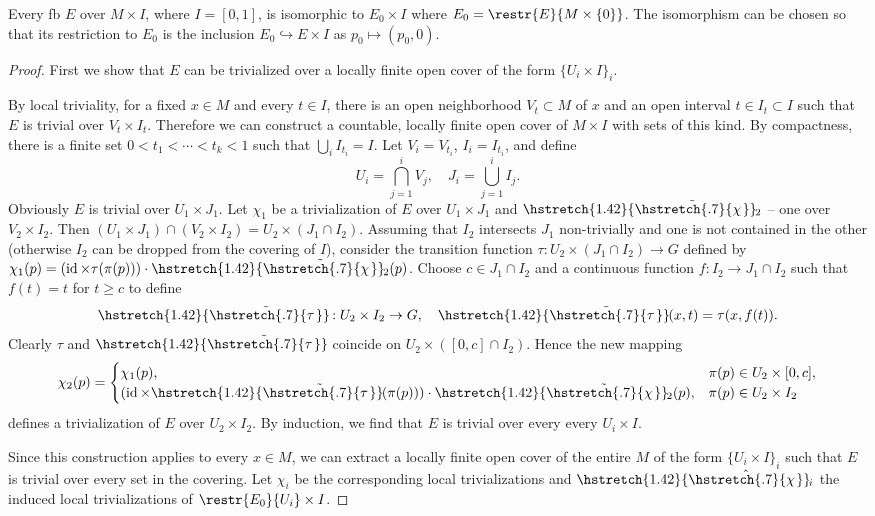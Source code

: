 \documentclass[english,letterpaper]{article}%
\numberwithin{equation}{section}
\numberwithin{figure}{section}
\numberwithin{table}{section}
\theoremstyle{definition}
\theoremstyle{definition}
\theoremstyle{definition}
\theoremstyle{plain}
\theoremstyle{plain}
\theoremstyle{plain}
\theoremstyle{plain}
\theoremstyle{remark}
\theoremstyle{remark}
\renewcommand{\geq}{\geqslant}
\DeclareMathOperator{\id}{id}
\newcommand\wh[1]{\hstretch{1.42}{\hat{\hstretch{.7}{#1\mkern2mu}}}\mkern-2mu} %
\newcommand\wt[1]{\hstretch{1.42}{\tilde{\hstretch{.7}{#1\mkern2mu}}}\mkern-2mu}
\begin{document}
\begin{thm}\label{bundles over MxI}
    Every \gls{fb} $E$ over $M\times I$, where $I=[0,1]$, is isomorphic to $E_0\times I$ where $E_0=\restr{E}{M\times\{0\}}$. The isomorphism can be chosen so that its restriction to $E_0$ is the inclusion $E_0\hookrightarrow E\times I$ as $p_0\mapsto (p_0,0)$.
\end{thm}
\begin{proof}
    First we show that $E$ can be trivialized over a locally finite open cover of the form $\{U_i\times I\}_i$.

    By local triviality, for a fixed $x\in M$ and every $t\in I$, there is an open neighborhood $V_t\subset M$ of $x$ and an open interval $t\in I_t\subset I$ such that $E$ is trivial over $V_t\times I_t$. Therefore we can construct a countable, locally finite open cover of $M\times I$ with sets of this kind. By compactness, there is a finite set $0<t_1<\cdots<t_k<1$ such that $\bigcup_i I_{t_i}=I$. Let $V_i=V_{t_i}$, $I_i=I_{t_i}$, and define 
    \[
        U_i=\bigcap_{j=1}^i V_j,\quad J_i=\bigcup_{j=1}^i I_j.
    \]
    Obviously $E$ is trivial over $U_1\times J_1$. Let $\chi_1$ be a trivialization of $E$ over $U_1\times J_1$ and $\wt{\chi}_2$ -- one over $V_2\times I_2$. Then $(U_1\times J_1)\cap (V_2\times I_2)=U_2\times (J_1\cap I_2)$. Assuming that $I_2$ intersects $J_1$ non-trivially and one is not contained in the other (otherwise $I_2$ can be dropped from the covering of $I$), consider the transition function $\tau:U_2\times(J_1\cap I_2)\to G$ defined by $\chi_1(p)=\left(\id\times    \tau(\pi(p))\right)\cdot \wt{\chi}_2(p)$. Choose $c\in J_1\cap I_2$ and a continuous function $f:I_2\to J_1\cap I_2$ such that $f(t)=t$ for $t\geq c$ to define 
    \[
        \wt{\tau}:U_2\times I_2\to G,\quad \wt{\tau}(x,t)=\tau(x,f(t)).
    \]
    Clearly $\tau$ and $\wt{\tau}$ coincide on $U_2\times([0,c]\cap I_2)$. Hence the new mapping
    \[
    \chi_2(p)=\begin{cases}
    \chi_1(p), & \pi(p)\in U_2\times[0,c],\\
    (\id\times\wt{\tau}(\pi(p)))\cdot \wt{\chi}_2(p), & \pi(p)\in U_2\times I_2
    \end{cases}
    \]
    defines a trivialization of $E$ over $U_2\times I_2$. By induction, we find that $E$ is trivial over every every $U_i\times I$. 

    Since this construction applies to every $x\in M$, we can extract a locally finite open cover of the entire $M$ of the form $\{U_i\times I\}_i$ such that $E$ is trivial over every set in the covering. Let $\chi_i$ be the corresponding local trivializations and $\wh{\chi}_i$ the induced local trivializations of $\restr{E_0}{U_i}\times I$.


\end{proof}
\end{document}

